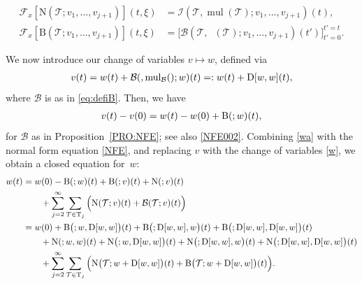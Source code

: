 \documentclass[%
11pt,  reqno]{amsart}
\makeatletter
\newcommand{\5}{\textup{V}}
\newcommand{\noi}{\noindent}
\theoremstyle{remark}
\newcommand{\TT}{\mathcal{T}}
\newcommand{\Tr}{\mathrm{T}}
\newcommand{\Ft}{{\mathcal{F}}}
\DeclareMathOperator{\mul}{mul}
\DeclareMathOperator{\mulB}{mul_{\mathcal{B}}}
\def\<#1>{\csname MH@symb@#1\endcsname}
\newcommand{\B}{\mathcal{B}}
\newcommand{\Ical}{\mathcal{I}}
\numberwithin{equation}{section}
\numberwithin{theorem}{section}
\newcommand{\NN}{\mathrm{N}}
\newcommand{\BB}{\mathrm{B}}
\newcommand{\D}{\mathrm{D}}
\makeatother
\begin{document}
\noi
\begin{align*}
\Ft_x [\NN(\TT; v_1, \ldots, v_{j+1} ) ] (t, \xi )
&= 
\Ical(\TT,\mul(\TT) ; v_1, \ldots,
v_{j+1} ) (t)
, \\
\Ft_x [\BB(\TT; v_1, \ldots, v_{j+1}) ] (t, \xi) &=
\big[ \B (\TT,\mulB(\TT) ; v_1,\dots,v_{j+1}) (t')\big]_{t'=0}^{t'=t}.
\end{align*}


We now introduce our change of variables $v\mapsto w$, defined via
\begin{align}
\label{w}
v(t) 
=
w(t) + \B(\<1>, \mulB(\<1>); w)(t)
=:
w(t) + \D[w, w](t)
,
\end{align}
where $\B$ is as in \eqref{eq:defiB}. Then, we have
\begin{align}
\label{wa}
v(t) - v(0) 
=
w(t) - w(0) + \BB(\<1>; w)(t), 
\end{align}
for $\B$ as in 
Proposition~\ref{PRO:NFE}; see also \eqref{NFE002}.
%
Combining \eqref{wa} with the normal form equation \eqref{NFE}, and replacing $v$ with the change of variables \eqref{w}, we obtain a closed equation for~$w$:
\begin{align}
w(t) & = w(0) -  \BB(\<1>;w)(t) + \BB(\<1>;v) (t) + \NN(\<1>;v)(t) 
\nonumber\\
& \qquad + \sum_{j=2}^\infty \sum_{\TT\in\Tr_j} \Big( \NN(\TT; v) (t) +
\B(\TT; v) (t)
 \Big) \nonumber\\
& = w(0) 
+ \BB\big(\<1>; w, \D[w, w] \big) (t)
+ \BB \big(\<1>; \D[w, w],w\big) (t) 
+
\BB\big(\<1>; \D[w,w], \D[w, w]\big) (t)
  \nonumber\\
& \qquad 
+ \NN(\<1>; w ,w ) (t) + \NN\big(\<1>; w, \D[w, w]\big) (t)
+
\NN\big(\<1>; \D[w, w], w\big) (t)
+ \NN\big(\<1>; \D[w, w],\D[w, w]\big) (t)
 \nonumber\\
& \qquad 
+ \sum_{j=2}^\infty \sum_{\TT\in \Tr_j} 
\Big( \NN\big(\TT; w+
\D[w, w]
\big) (t)
+  \BB\big(\TT; w + \D[w, w]\big)(t) \Big).
\label{w1}
\end{align}
\end{document}
